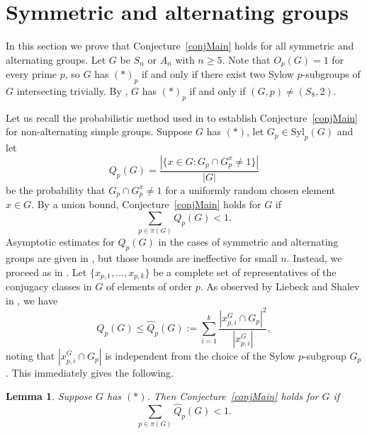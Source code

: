 \documentclass[11pt]{amsart}
\numberwithin{equation}{section}
\newtheorem{lemma}[theorem]{Lemma}
\theoremstyle{definition}
\theoremstyle{remark}
\begin{document}
\section{Symmetric and alternating groups} \label{sec3}

In this section we prove that Conjecture~\ref{conjMain} holds
for all symmetric and alternating groups.
Let $G$ be $S_n$ or $A_n$ with $n \geqslant 5$.
Note that $O_p(G) = 1$ for every prime $p$, so $G$ has $(*)_p$
if and only if there exist two Sylow $p$-subgroups of $G$ intersecting trivially.
By \cite{MZ96}, $G$ has $(*)_p$ if and only if $(G,p) \ne (S_8,2)$.

Let us recall the probabilistic method used in \cite{BH26}
to establish Conjecture~\ref{conjMain} for non-alternating simple groups.
Suppose $G$ has $(*)$, let $G_p \in \mathrm{Syl}_p(G)$ and let
\begin{equation*}
    Q_p(G) = \frac{|\{x \in G : G_p\cap G_p^x \ne 1\}|}{|G|}
\end{equation*}
be the probability that $G_p\cap G_p^x \ne 1$ for a uniformly random chosen element $x\in G$.
By a union bound, Conjecture~\ref{conjMain} holds for $G$ if
\begin{equation*}
    \sum_{p\in\pi(G)} Q_p(G) < 1 .
\end{equation*}
Asymptotic estimates for $Q_p(G)$ in the cases of symmetric and alternating groups
are given in \cite{DGG+26,Ebe26}, but those bounds are ineffective for small $n$.
Instead, we proceed as in \cite[page~5]{BH26}.
Let $\{x_{p,1},\dots,x_{p,k}\}$ be a complete set of representatives
of the conjugacy classes in $G$ of elements of order $p$.
As observed by Liebeck and Shalev in \cite[Proof of Theorem~1.3]{LS99}, we have
\begin{equation*}
    Q_p(G) \leqslant\widehat{Q}_p(G):= \sum_{i = 1}^k \frac{|x_{p,i}^G\cap G_p|^2}{|x_{p,i}^G|},
\end{equation*}
noting that $|x_{p,i}^G\cap G_p|$ is independent from the choice of the Sylow $p$-subgroup $G_p$.
This immediately gives the following.

\begin{lemma}
    \label{l:sym_prob}
    Suppose $G$ has $(*)$. Then Conjecture~\ref{conjMain} holds for $G$ if
    \begin{equation*}
    \sum_{p\in\pi(G)} \widehat{Q}_p(G) < 1.
\end{equation*}
\end{lemma} 
\end{document}
